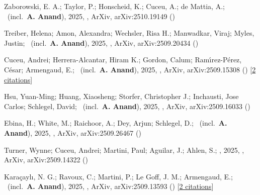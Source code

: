 \item[{\color{numcolor}\scriptsize12}] Zaborowski, E. A.; Taylor, P.; Honscheid, K.; Cuceu, A.; de Mattia, A.; \etal\ (incl.\ \textbf{A. Anand}), 2025, , ArXiv, arXiv:2510.19149 ()

\item[{\color{numcolor}\scriptsize11}] Treiber, Helena; Amon, Alexandra; Wechsler, Risa H.; Manwadkar, Viraj; Myles, Justin; \etal\ (incl.\ \textbf{A. Anand}), 2025, , ArXiv, arXiv:2509.20434 ()

\item[{\color{numcolor}\scriptsize10}] Cuceu, Andrei; Herrera-Alcantar, Hiram K.; Gordon, Calum; Ram{\'\i}rez-P{\'e}rez, C{\'e}sar; Armengaud, E.; \etal\ (incl.\ \textbf{A. Anand}), 2025, , ArXiv, arXiv:2509.15308 () [\href{https://ui.adsabs.harvard.edu/abs/2025arXiv250915308C}{2 citations}]

\item[{\color{numcolor}\scriptsize9}] Hsu, Yuan-Ming; Huang, Xiaosheng; Storfer, Christopher J.; Inchausti, Jose Carlos; Schlegel, David; \etal\ (incl.\ \textbf{A. Anand}), 2025, , ArXiv, arXiv:2509.16033 ()

\item[{\color{numcolor}\scriptsize8}] Ebina, H.; White, M.; Raichoor, A.; Dey, Arjun; Schlegel, D.; \etal\ (incl.\ \textbf{A. Anand}), 2025, , ArXiv, arXiv:2509.26467 ()

\item[{\color{numcolor}\scriptsize7}] Turner, Wynne; Cuceu, Andrei; Martini, Paul; Aguilar, J.; Ahlen, S.; \etal, 2025, , ArXiv, arXiv:2509.14322 ()

\item[{\color{numcolor}\scriptsize6}] Kara{\c{c}}ayl{\i}, N. G.; Ravoux, C.; Martini, P.; Le Goff, J. M.; Armengaud, E.; \etal\ (incl.\ \textbf{A. Anand}), 2025, , ArXiv, arXiv:2509.13593 () [\href{https://ui.adsabs.harvard.edu/abs/2025arXiv250913593K}{2 citations}]

